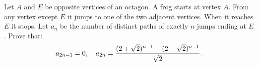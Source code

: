 Let $A$ and $E$ be opposite vertices of an octagon. A frog starts at vertex $A.$ From any vertex except $E$ it jumps to one of the two adjacent vertices. When it reaches $E$ it stops. Let $a_n$ be the number of distinct paths of exactly $n$ jumps ending at $E$. Prove that: \[ a_{2n-1}=0, \quad a_{2n}={(2+\sqrt2)^{n-1} - (2-\sqrt2)^{n-1} \over\sqrt2}. \]
